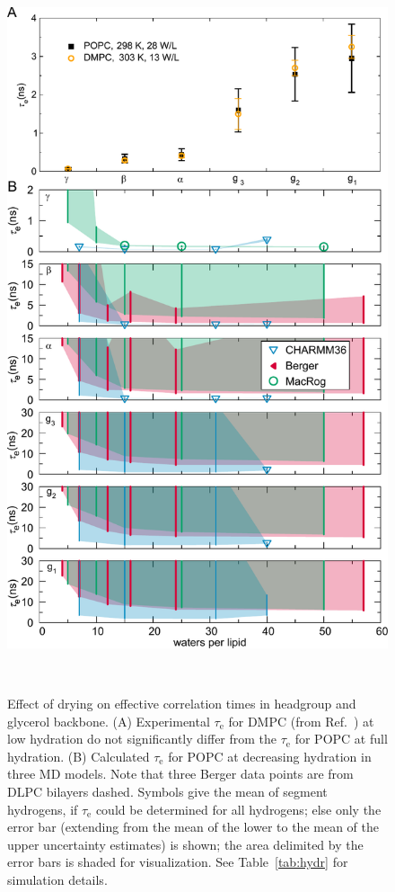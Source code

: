 \documentclass[journal=jpcbfk,manuscript=article,layout=twocolumn]{achemso}
\begin{document}
\begin{figure}[ht!]
\centering
\includegraphics[width=\columnwidth]{../Figs/hydration_2020.pdf} 

\caption{Effect of drying on %
effective correlation times %
in headgroup and glyc\-er\-ol backbone.
(A) Experimental $\tau_\mathrm e$ for
DMPC (from Ref.~) at low hydration %
do not significantly differ from the
$\tau_\mathrm e$ for POPC at full hydration. %
(B) Calculated $\tau_\mathrm e$  for
POPC at decreasing hydration in three MD models.
Note that three Berger data points are from DLPC bilayers {\color{red} dashed}.
Symbols give the mean of segment hydrogens,
if $\tau_\mathrm{e}$ could be determined for all hydrogens; else only the error bar
(extending from the mean of the lower to the mean of the upper uncertainty estimates) is shown;
the area delimited by the error bars is shaded for visualization.
See Table~\ref{tab:hydr} for simulation details.}
\label{fig:hydration}
\\
\end{figure}
\end{document}
